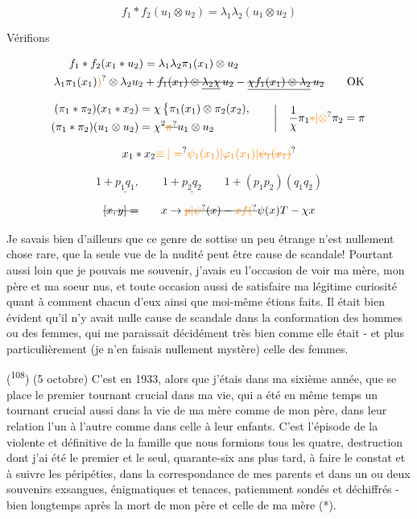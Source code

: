 \[
 f_1\ast f_2(u_1\otimes u_2)=\lambda_1\lambda_2(u_1\otimes u_2)
\]

\qquad Vérifions

\[
\begin{aligned}
 f_1\ast f_2(x_1\ast u_2)&=\lambda_1\lambda_2\pi_1(x_1)\otimes u_2\\
 \lambda_1\pi_1(x_1)\unsure{)}\otimes\lambda_2 u_2
 &+\deleted{f_1(x_1)\otimes\underline{\lambda_2\chi}\,u_2}
 -\deleted{\underline{\chi f_1(x_1)\otimes\lambda_2}\,u_2}\qquad\text{OK}
\end{aligned}
\]

\[
\begin{aligned}
(\pi_1\ast\pi_2)(x_1\ast x_2)&=\chi\,\big\{\pi_1(x_1)\otimes\pi_2(x_2),\\
(\pi_1\ast\pi_2)(u_1\otimes u_2)&=\chi^2\deleted{\unsure{\pi}}u_1\otimes u_2
\end{aligned}
\qquad\left|\quad \frac1\chi\pi_1\unsure{\ast|\otimes}\pi_2=\pi\right.
\]

\[
 x_1\ast x_2\unsure{\equiv|=}\unsure{\psi_1(x_1)|\varphi_1(x_1)|\deleted{\psi_1(x_1)}}
\]


\[
 1+\underline{p_1q_1},\qquad 1+\underline{p_2q_2}\qquad 1+(p_1p_2)(q_1q_2)
\]

\[
 \deleted{[x,y]=}\qquad x\to\deleted{\unsure{p|\psi}(x)-\unsure{xf(}}\psi(x)T-\chi x
\]



Je savais bien d'ailleurs que ce genre de sottise un peu étrange n'est nullement chose rare, que la seule vue de la nudité peut être cause de scandale! Pourtant aussi loin que je pouvais me souvenir, j'avais eu l'occasion de voir ma mère, mon père et ma soeur nus, et toute occasion aussi de satisfaire ma légitime curiosité quant à comment chacun d'eux ainsi que moi-même étions faits. Il était bien évident qu'il n'y avait nulle cause de scandale dans la conformation des hommes ou des femmes, qui me paraissait décidément très bien comme elle était - et plus particulièrement (je n'en faisais nullement mystère) celle des femmes.

(\textsuperscript{108}) (5 octobre) C'est en 1933, alors que j'étais dans ma sixième année, que se place le premier tournant crucial dans ma vie, qui a été en même temps un tournant crucial aussi dans la vie de ma mère comme de mon père, dans leur relation l'un à l'autre comme dans celle à leur enfants. C'est l'épisode de la  violente et définitive de la famille que nous formions tous les quatre, destruction dont j'ai été le premier et le seul, quarante-six ans plus tard, à faire le constat et à suivre les péripéties, dans la correspondance de mes parents et dans un ou deux souvenirs exsangues, énigmatiques et tenaces, patiemment sondés et déchiffrés - bien longtemps après la mort de mon père et celle de ma mère (*).

